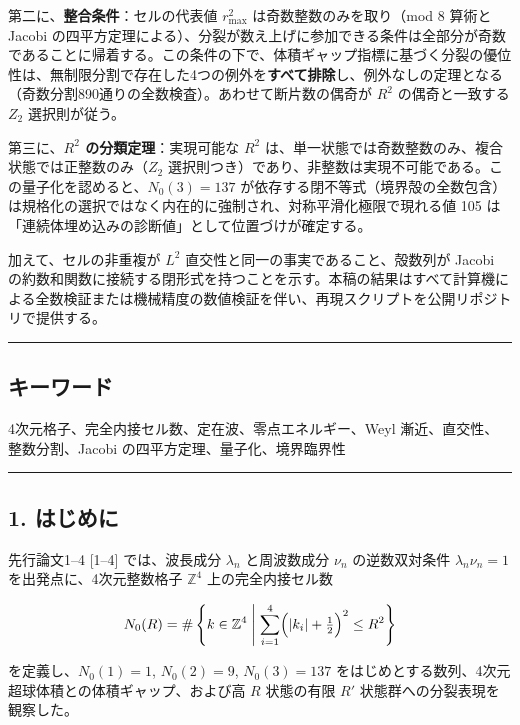 \documentclass[
]{ltjsarticle}
\begin{document}
第二に、\textbf{整合条件}：セルの代表値 \(r_{\max}^2\)
は奇数整数のみを取り（mod 8 算術と Jacobi
の四平方定理による）、分裂が数え上げに参加できる条件は全部分が奇数であることに帰着する。この条件の下で、体積ギャップ指標に基づく分裂の優位性は、無制限分割で存在した4つの例外を\textbf{すべて排除}し、例外なしの定理となる（奇数分割890通りの全数検査）。あわせて断片数の偶奇が
\(R^2\) の偶奇と一致する \(Z_2\) 選択則が従う。

第三に、\textbf{\(R^2\) の分類定理}：実現可能な \(R^2\)
は、単一状態では奇数整数のみ、複合状態では正整数のみ（\(Z_2\)
選択則つき）であり、非整数は実現不可能である。この量子化を認めると、\(N_0(3)=137\)
が依存する閉不等式（境界殻の全数包含）は規格化の選択ではなく内在的に強制され、対称平滑化極限で現れる値
105 は「連続体埋め込みの診断値」として位置づけが確定する。

加えて、セルの非重複が \(L^2\) 直交性と同一の事実であること、殻数列が
Jacobi
の約数和関数に接続する閉形式を持つことを示す。本稿の結果はすべて計算機による全数検証または機械精度の数値検証を伴い、再現スクリプトを公開リポジトリで提供する。

\begin{center}\rule{0.5\linewidth}{0.5pt}\end{center}

\subsection{キーワード}\label{ux30adux30fcux30efux30fcux30c9}

4次元格子、完全内接セル数、定在波、零点エネルギー、Weyl
漸近、直交性、整数分割、Jacobi の四平方定理、量子化、境界臨界性

\begin{center}\rule{0.5\linewidth}{0.5pt}\end{center}

\subsection{1. はじめに}\label{ux306fux3058ux3081ux306b}

先行論文1--4 {[}1--4{]} では、波長成分 \(\lambda_n\) と周波数成分
\(\nu_n\) の逆数双対条件 \(\lambda_n\nu_n=1\) を出発点に、4次元整数格子
\(\mathbb{Z}^4\) 上の完全内接セル数

\[
N_0(R)=\#\left\{k\in\mathbb{Z}^4\;\middle|\;\sum_{i=1}^4\Bigl(|k_i|+\tfrac12\Bigr)^2\le R^2\right\}
\]

を定義し、\(N_0(1)=1\), \(N_0(2)=9\), \(N_0(3)=137\)
をはじめとする数列、4次元超球体積との体積ギャップ、および高 \(R\)
状態の有限 \(R'\) 状態群への分裂表現を観察した。
\end{document}
